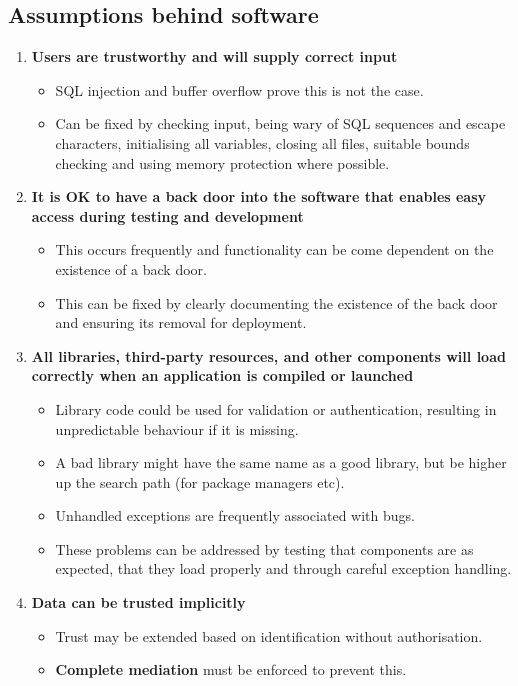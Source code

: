\documentclass{article}
\begin{document}
\subsection{Assumptions behind software}
\begin{enumerate}
	\item \textbf{Users are trustworthy and will supply correct input}
	\begin{itemize}
		\item SQL injection and buffer overflow prove this is not the case.
		\item Can be fixed by checking input, being wary of SQL sequences and escape characters, initialising all variables, closing all files, suitable bounds checking and using memory protection where possible.
	\end{itemize}
	\item \textbf{It is OK to have a back door into the software that enables easy access during testing and development}
	\begin{itemize}
		\item This occurs frequently and functionality can be come dependent on the existence of a back door.
		\item This can be fixed by clearly documenting the existence of the back door and ensuring its removal for deployment.
	\end{itemize}
	\item \textbf{All libraries, third-party resources, and other components will load correctly when an application is compiled or launched}
	\begin{itemize}
		\item Library code could be used for validation or authentication, resulting in unpredictable behaviour if it is missing.
		\item A bad library might have the same name as a good library, but be higher up the search path (for package managers etc).
		\item Unhandled exceptions are frequently associated with bugs.
		\item These problems can be addressed by testing that components are as expected, that they load properly and through careful exception handling.
	\end{itemize}
	\item \textbf{Data can be trusted implicitly}
	\begin{itemize}
		\item Trust may be extended based on identification without authorisation.
		\item \textbf{Complete mediation} must be enforced to prevent this.

\end{itemize}
\end{enumerate}
\end{document}
